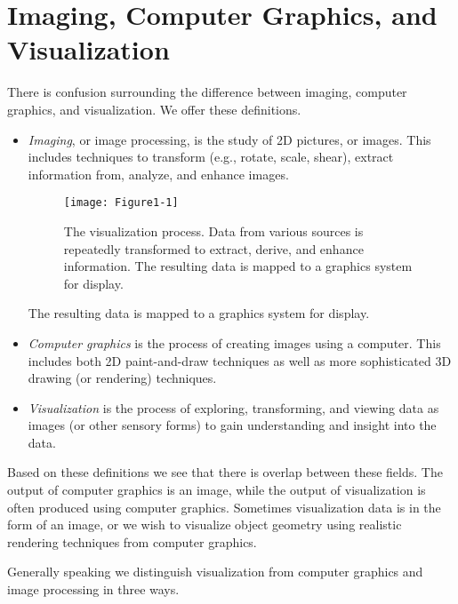 \section{Imaging, Computer Graphics, and Visualization}
\label{sec:imaging_computer_graphics_visualization}

There is confusion surrounding the difference between imaging, computer graphics, and visualization. We offer these definitions.

\begin{itemize}
  \item  \emph{Imaging}, or image processing, is the study of 2D pictures, or images. This includes techniques to transform (e.g., rotate, scale, shear), extract information from, analyze, and enhance images.
\begin{figure}[ht]
  \centering
  \texttt{[image: Figure1-1]}\\
  \caption{The visualization process. Data from various sources is repeatedly transformed to extract, derive, and enhance information. The resulting data is mapped to a graphics system for display.}\label{fig:Figure1-1}
\end{figure}

The resulting data is mapped to a graphics system for display.

  \item  \emph{Computer graphics} is the process of creating images using a computer. This includes both 2D paint-and-draw techniques as well as more sophisticated 3D drawing (or rendering) techniques.

  \item \emph{Visualization} is the process of exploring, transforming, and viewing data as images (or other sensory forms) to gain understanding and insight into the data.
\end{itemize}

Based on these definitions we see that there is overlap between these fields. The output of computer graphics is an image, while the output of visualization is often produced using computer graphics. Sometimes visualization data is in the form of an image, or we wish to visualize object geometry using realistic rendering techniques from computer graphics.

Generally speaking we distinguish visualization from computer graphics and image processing in three ways.

